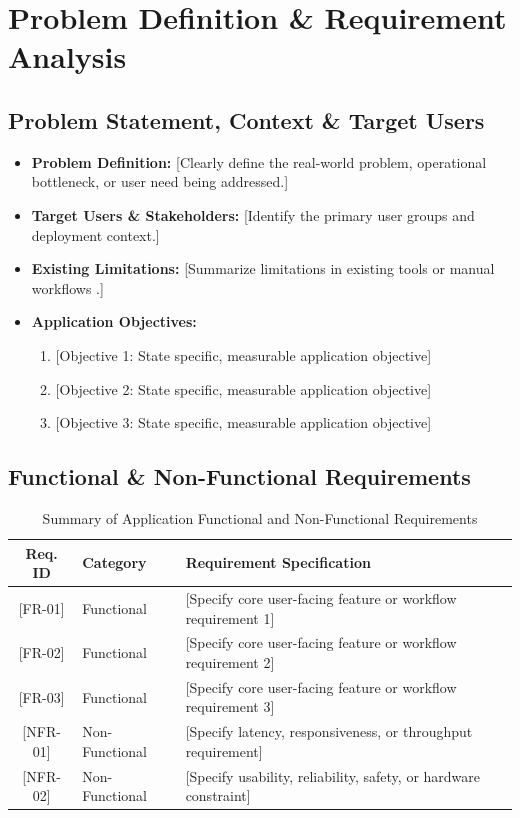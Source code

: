 \documentclass[11pt, a4paper]{article}
\begin{document}
\section{Problem Definition \& Requirement Analysis}

\subsection{Problem Statement, Context \& Target Users}
\begin{itemize}[noitemsep, topsep=2pt]
    \item \textbf{Problem Definition:} {[Clearly define the real-world problem, operational bottleneck, or user need being addressed.]}
    \item \textbf{Target Users \& Stakeholders:} {[Identify the primary user groups and deployment context.]}
    \item \textbf{Existing Limitations:} {[Summarize limitations in existing tools or manual workflows \cite{ref1,ref2}.]}
    \item \textbf{Application Objectives:}
    \begin{enumerate}[noitemsep, topsep=2pt]
        \item {[Objective 1: State specific, measurable application objective]}
        \item {[Objective 2: State specific, measurable application objective]}
        \item {[Objective 3: State specific, measurable application objective]}
    \end{enumerate}
\end{itemize}

\subsection{Functional \& Non-Functional Requirements}
\begin{table}[H]
    \centering
    \footnotesize
    \renewcommand{\arraystretch}{1.25}
    \begin{tabular}{|c|p{3.0cm}|p{9.2cm}|}
        \hline
        \textbf{Req. ID} & \textbf{Category} & \textbf{Requirement Specification} \\
        \hline
        {[FR-01]} & Functional & {[Specify core user-facing feature or workflow requirement 1]} \\
        \hline
        {[FR-02]} & Functional & {[Specify core user-facing feature or workflow requirement 2]} \\
        \hline
        {[FR-03]} & Functional & {[Specify core user-facing feature or workflow requirement 3]} \\
        \hline
        {[NFR-01]} & Non-Functional & {[Specify latency, responsiveness, or throughput requirement]} \\
        \hline
        {[NFR-02]} & Non-Functional & {[Specify usability, reliability, safety, or hardware constraint]} \\
        \hline
    \end{tabular}
    \caption{Summary of Application Functional and Non-Functional Requirements}
\end{table}
\end{document}
